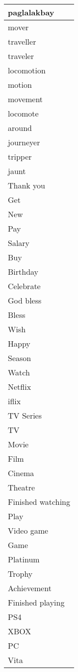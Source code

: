 \begin{longtable}{|p{3cm}|}
paglalakbay \\ \hline
mover \\ \hline
traveller \\ \hline
traveler \\ \hline
locomotion \\ \hline
motion \\ \hline
movement \\ \hline
locomote \\ \hline
around \\ \hline
journeyer \\ \hline
tripper \\ \hline
jaunt  \\ \hline
Thank you\\ \hline
Get\\ \hline
New\\ \hline
Pay\\ \hline
Salary\\ \hline
Buy\\ \hline
Birthday\\ \hline
Celebrate\\ \hline
God bless\\ \hline
Bless\\ \hline
Wish\\ \hline
Happy\\ \hline
Season\\ \hline
Watch\\ \hline
Netflix\\ \hline
iflix\\ \hline
TV Series\\ \hline
TV\\ \hline
Movie\\ \hline
Film\\ \hline
Cinema\\ \hline
Theatre\\ \hline
Finished watching\\ \hline
Play\\ \hline
Video game\\ \hline
Game\\ \hline
Platinum\\ \hline
Trophy\\ \hline
Achievement\\ \hline
Finished playing\\ \hline
PS4\\ \hline
XBOX\\ \hline
PC\\ \hline
Vita\\ \hline

\end{longtable}
